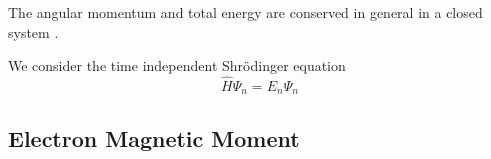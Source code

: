 The angular momentum and total energy are conserved in general in a closed system . 

We consider the time independent Shr\"odinger equation
\begin{equation}
    \hat{H} \Psi_n = E_n \Psi_n 
    \label{eq:TISE}
\end{equation}
\subsection{Electron Magnetic Moment}
\cite{PhysRevLett.130.071801}




%
%
%
%
%
